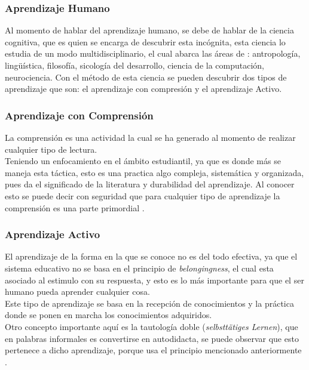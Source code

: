     \subsubsection{Aprendizaje Humano}
    	
    	
        Al momento de hablar del aprendizaje humano, se debe de hablar de la ciencia cognitiva, que es quien se encarga de descubrir esta incógnita,
        esta ciencia lo estudia de un modo multidisciplinario, el cual abarca las \'areas de \cite{bransford2000}: antropología, lingüística, 
        filosofía, sicología del desarrollo, ciencia de la computación, neurociencia.
        Con el método de esta ciencia se pueden descubrir dos tipos de aprendizaje que son: el aprendizaje con compresi\'on y el aprendizaje Activo.
        
        \subsubsection{Aprendizaje con Comprensi\'on}
        	
        	
            La comprensi\'on es una actividad la cual se ha generado al momento de realizar cualquier tipo de lectura.\\
            
            Teniendo un enfocamiento en el \'ambito estudiantil, ya que es donde m\'as se maneja esta t\'actica, esto es una
            practica algo compleja, sistemática y organizada, pues da el significado de la literatura y durabilidad del aprendizaje.
            Al conocer esto se puede decir con seguridad que para cualquier tipo de aprendizaje la comprensi\'on es 
            una parte primordial \cite{perez2014}.

        \subsubsection{Aprendizaje Activo}
        	
        	
            El aprendizaje de la forma en la que se conoce no es del todo efectiva, ya que el sistema educativo
            no se basa en el principio de \textit{belongingness}, el cual esta asociado al estimulo con su respuesta,
            y esto es lo m\'as importante para que el ser humano pueda aprender cualquier cosa.\\
            
            Este tipo de aprendizaje se basa en la recepci\'on de conocimientos y la pr\'actica donde se ponen en marcha los conocimientos adquiridos.\\
            Otro concepto importante aqu\'i es la tautolog\'ia doble (\textit{selbstt\"atiges Lernen}), que en palabras informales es convertirse en autodidacta, 
            se puede observar que esto pertenece a dicho aprendizaje, porque usa el principio mencionado anteriormente \cite{Huber2008}.

